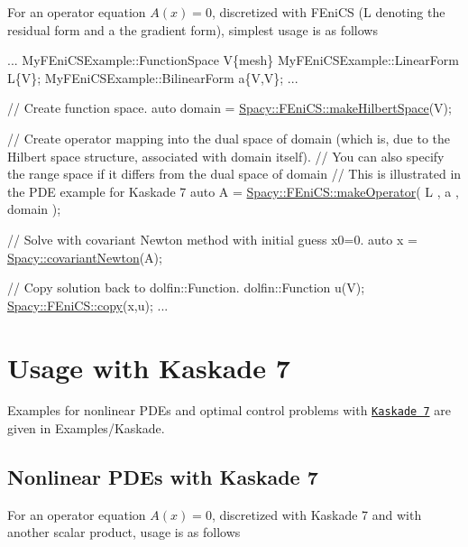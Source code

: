 For an operator equation $A(x)=0$, discretized with F\+Eni\+C\+S (\textquotesingle{}L\textquotesingle{} denoting the residual form and \textquotesingle{}a\textquotesingle{} the gradient form), simplest usage is as follows 
\begin{DoxyCode}
...
MyFEniCSExample::FunctionSpace V\{mesh\}
MyFEniCSExample::LinearForm L\{V\};
MyFEniCSExample::BilinearForm a\{V,V\};
...

\textcolor{comment}{// Create function space.}
auto domain = \hyperlink{group__FenicsGroup_ga89defe8c7e08ab224af2a3cd0445e254_ga89defe8c7e08ab224af2a3cd0445e254}{Spacy::FEniCS::makeHilbertSpace}(V);

\textcolor{comment}{// Create operator mapping into the dual space of domain (which is, due to the Hilbert space structure,
       associated with domain itself).}
\textcolor{comment}{// You can also specify the range space if it differs from the dual space of domain}
\textcolor{comment}{// This is illustrated in the PDE example for Kaskade 7}
\textcolor{keyword}{auto} A = \hyperlink{group__KaskadeGroup_ga0e8d7d2c51e429e22561ef813fc97589_ga0e8d7d2c51e429e22561ef813fc97589}{Spacy::FEniCS::makeOperator}( L , a , domain );

\textcolor{comment}{// Solve with covariant Newton method with initial guess x0=0.}
\textcolor{keyword}{auto} x = \hyperlink{group__NewtonGroup_gab9d1c5b64e93d7ac051f8a7b41bf520a_gab9d1c5b64e93d7ac051f8a7b41bf520a}{Spacy::covariantNewton}(A);


\textcolor{comment}{// Copy solution back to dolfin::Function.}
dolfin::Function u(V);
\hyperlink{group__FenicsGroup_ga7f43f0c660d0646adb031b453c536bb0_ga7f43f0c660d0646adb031b453c536bb0}{Spacy::FEniCS::copy}(x,u);
...
\end{DoxyCode}
\hypertarget{index_sec_usage_kaskade}{}\section{Usage with Kaskade 7}\label{index_sec_usage_kaskade}
Examples for nonlinear P\+D\+Es and optimal control problems with \href{http://www.zib.de/projects/kaskade7-finite-element-toolbox}{\tt Kaskade 7} are given in Examples/\+Kaskade.\hypertarget{index_sub_usage_kaskade_pde}{}\subsection{Nonlinear P\+D\+Es with Kaskade 7}\label{index_sub_usage_kaskade_pde}
For an operator equation $A(x)=0$, discretized with Kaskade 7 and with another scalar product, usage is as follows 
